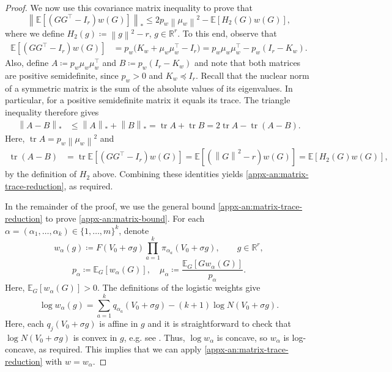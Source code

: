 \documentclass[11pt,letterpaper]{article}
\theoremstyle{remark}
\newcommand{\E}{\mathbb E}
\newcommand{\R}{\mathbb R}
\newcommand{\tr}{\operatorname{tr}}
\newcommand{\norm}[1]{\left\lVert#1\right\rVert}
\begin{document}
\begin{proof}
We now use this covariance matrix inequality to prove that
\begin{equation}
\left\|\E[(GG^\top-I_r)w(G)]\right\|_*
\le 2p_w\norm{\mu_w}^2
 -\E[H_2(G)w(G)],
\label{appx-an:matrix-trace-reduction}
\end{equation}
where we define \(H_2(g)\coloneqq\norm g^2-r\), $g\in\R^r$. To this end, observe that
\begin{align*}
\E[(GG^\top-I_r)w(G)]
&=p_w\bigl(K_w+\mu_w\mu_w^\top-I_r\bigr)
=p_w\mu_w\mu_w^\top-p_w(I_r-K_w).
\end{align*}
Also, define $A\coloneqq p_w\mu_w\mu_w^\top$ and $B\coloneqq p_w(I_r-K_w)$ and note that
both matrices are positive semidefinite, since
\(p_w>0\) and \(K_w\preceq I_r\).
Recall that the nuclear norm of a symmetric
matrix is the sum of the absolute values of its
eigenvalues. In particular, for a positive
semidefinite matrix it equals its trace.
The triangle inequality therefore gives
\begin{align*}
\norm{A-B}_*
&\le\norm A_*+\norm B_*
=\tr A+\tr B
=2\tr A-\tr(A-B).
\end{align*}
Here, $\tr A=p_w\norm{\mu_w}^2$ and
\begin{align*}
\tr(A-B)
&=\tr\E[(GG^\top-I_r)w(G)]
=\E[(\norm G^2-r)w(G)]
=\E[H_2(G)w(G)],
\end{align*}
by the definition of $H_2$ above. Combining these identities yields \eqref{appx-an:matrix-trace-reduction}, as required.

In the remainder of the proof, we use the general bound \eqref{appx-an:matrix-trace-reduction} to prove \eqref{appx-an:matrix-bound}. For each \(\alpha=(\alpha_1,\ldots,\alpha_k)\in\{1,\dots,m\}^k\), denote
\[
 w_\alpha(g)\coloneqq F(V_0+\sigma g)
                 \prod_{a=1}^k\pi_{\alpha_a}(V_0+\sigma g),\qquad g\in\R^r,
\]
\[
p_\alpha\coloneqq \E_G[w_\alpha(G)],
 \quad \mu_\alpha\coloneqq \frac{\E_G[Gw_\alpha(G)]}{p_\alpha}.
\]
Here, $\E_G[w_\alpha(G)]>0$. The definitions of the logistic weights give
\[
 \log w_\alpha(g)
 =\sum_{a=1}^k q_{\alpha_a}(V_0+\sigma g)
  -(k+1)\log N(V_0+\sigma g).
\]
Here, each \(q_j(V_0+\sigma g)\) is affine in \(g\) and it is straightforward to check that \(\log N(V_0+\sigma g)\) is convex in \(g\), e.g. see \cite[Section~3.1.5, pp.~72--74]{BoydVandenberghe2004}. Thus,
\(\log w_\alpha\) is concave, so \(w_\alpha\) is log-concave, as required. This implies that we can apply \eqref{appx-an:matrix-trace-reduction} with $w=w_\alpha$.



\end{proof}
\end{document}
